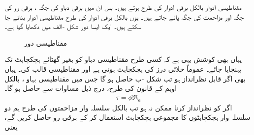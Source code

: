 مقناطیسی ادوار بالکل برقی ادوار کی طرح ہوتے ہیں۔ بس ان میں برقی دباو  کی جگہ   ، برقی رو   کی جگہ    اور مزاحمت  کی جگہ     پائے جاتے ہیں۔ یوں  بالکل برقی ادوار کی طرح مقناطیسی ادوار بنائے جا سکتے ہیں۔  ایک ایسا دور شکل -الف میں دکھایا گیا ہے۔
\begin{figure}
\centering
\begin{subfigure}[b]{0.40\textwidth}
\centering
{}%
\caption{}
\end{subfigure}\hfill
\begin{subfigure}[b]{0.50\textwidth}
\centering
{}
\caption{}
\end{subfigure}
\caption{مقناطیسی دور}
\label{شکل_مقناطیسی__مقناطیسی_سلسلہ_وار_دور}
\end{figure}
%
یہاں بھی کوشش یہی ہے کہ کسی طرح مقناطیسی دباو  کو بغیر گھٹائے ہچکچاہٹ  تک پہنچایا جائے۔ عموماً  خلائی درز کی ہچکچاہٹ ہوتی ہے اور  مقناطیسی قالب کی۔ یہاں بھی اگر  قابل نظرانداز ہو تب شکل -ب حاصل ہو گا جس میں مقناطیسی بہاو ، بالکل اوہم کے قانون کی طرح، درج ذیل مساوات سے حاصل ہو گا۔
\begin{align}
\tau=\phi \Re_a
\end{align}
اگر  کو نظرانداز کرنا ممکن نہ ہو تب بالکل سلسلہ وار مزاحمتوں کی طرح ہم  دو سلسلہ وار ہچکچاہٹوں کا مجموعی ہچکچاہٹ    استعمال کر کے برقی رو حاصل کریں گے، یعنی

